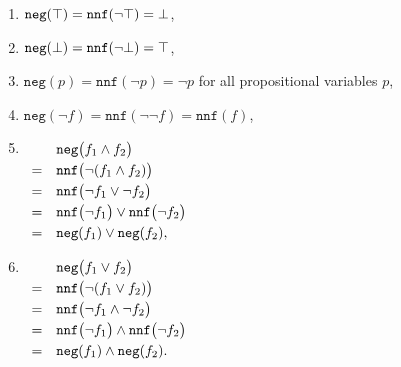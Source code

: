\begin{enumerate}
\item $\texttt{neg}(\top) = \mathtt{nnf}(\neg \top) = \bot$,
\item $\texttt{neg}(\bot) = \mathtt{nnf}(\neg \bot) = \top$,
\item $\texttt{neg}(p) = \mathtt{nnf}(\neg p) = \neg p$ for all propositional variables $p$,
\item $\texttt{neg}(\neg f) = \mathtt{nnf}(\neg \neg f) = \mathtt{nnf}(f)$,
\item $\begin{array}[t]{cl}
         & \texttt{neg}\bigl(f_1 \wedge f_2 \bigr) \\[0.1cm]
       = & \mathtt{nnf}\bigl(\neg(f_1 \wedge f_2)\bigr) \\[0.1cm]
       = & \mathtt{nnf}\bigl(\neg f_1 \vee \neg f_2\bigr) \\[0.1cm]
       = & \mathtt{nnf}\bigl(\neg f_1\bigr) \vee \mathtt{nnf}\bigl(\neg f_2\bigr) \\[0.1cm]
       = & \mathtt{neg}(f_1) \vee \mathtt{neg}(f_2),
       \end{array}
      $
\item $\begin{array}[t]{cl}
         & \texttt{neg}\bigl(f_1 \vee f_2 \bigr)        \\[0.1cm]
       = & \texttt{nnf}\bigl(\neg(f_1 \vee f_2) \bigr)  \\[0.1cm]
       = & \texttt{nnf}\bigl(\neg f_1 \wedge \neg f_2 \bigr)  \\[0.1cm]
       = & \texttt{nnf}\bigl(\neg f_1\bigr) \wedge \mathtt{nnf}\bigl(\neg f_2 \bigr)  \\[0.1cm]
       = & \mathtt{neg}(f_1) \wedge \mathtt{neg}(f_2). 
       \end{array}
      $
\end{enumerate}

